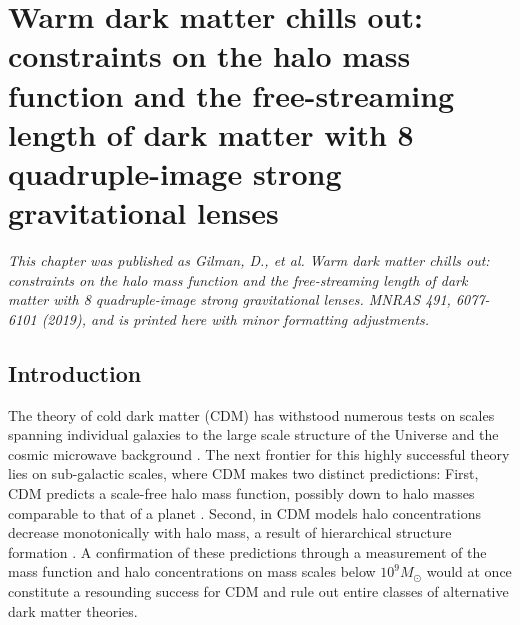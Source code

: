 \def\rein{{$R_{\rm{Ein}}$}}
\def\cmg{{\rm{$\rm{cm}^2 \rm{g}^{-1}$}}}
\def\msun{{M_{\odot}}}
\def\sigmasidm{{$\sigma_{\rm{SIDM}}$}}
\def\dlos{{\delta_{\rm{los}}}}
\def\mhm{{m_{\rm{hm}}}}

\def\data{{\bf{d}_{\rm{n}}}}
\def\datasim{{\bf{d}_{\rm{n}}^{\prime}}}
\def\msub{{\bf{m}_{\rm{sub}}}}
\def\qsub{{\bf{q}_{\rm{s}}}}
\def\fsub{{{f}_{\rm{sub}}}}
\def\fsubmean{{\bar{f}_{\rm{sub}}}}
\def\qmac{{\bf{M}}}
\def\qm{{}{\bf{M}}}
\def\sigmasubmean{0.035 \rm{kpc^{-2}}}
\def\sigmasubonesigma{0.025 < \Sigma_{\rm{sub}} < 0.05 \rm{kpc^{-2}}}
\def\sigmasubtwosigma{0.01 < \Sigma_{\rm{sub}} < 0.075 \rm{kpc^{-2}}}
\def\msubmean{3.9 \times 10^7 \msun \rm{kpc^{-2}}}
\def\msubonesigmalow{2.8 \times 10^7 \msun \rm{kpc^{-2}}}
\def\msubonesigmahigh{5.8 \times 10^7 \msun \rm{kpc^{-2}}}
\def\msubtwosigmalow{1.1 \times 10^7 \msun \rm{kpc^{-2}}}
\def\msubtwosigmalow{8.3 \times 10^7 \msun \rm{kpc^{-2}}}

\def\vspacing{\\[0.15cm]}

\chapter{Warm dark matter chills out: constraints on the halo mass function and the free-streaming length of dark matter with 8 quadruple-image strong gravitational lenses}
\textit{This chapter was published as Gilman, D., et al. Warm dark matter chills out: constraints on the halo mass function and the free-streaming length of dark matter with 8 quadruple-image strong gravitational lenses. MNRAS 491, 6077-6101 (2019), and is printed here with minor formatting adjustments.}
	
\section{Introduction}
The theory of cold dark matter (CDM) has withstood numerous tests on scales spanning individual galaxies to the large scale structure of the Universe and the cosmic microwave background \cite{Tegmark++04,deBlok++08,WMAP9cosmo}. The next frontier for this highly successful theory lies on sub-galactic scales, where CDM makes two distinct predictions: First, CDM predicts a scale-free halo mass function, possibly down to halo masses comparable to that of a planet \cite{Hofmann++01,Angulo++17}. Second, in CDM models halo concentrations decrease monotonically with halo mass, a result of hierarchical structure formation \cite{Moore++99,AvilaReese++01,Zhao++03,DiemerJoyce18}. A confirmation of these predictions through a measurement of the mass function and halo concentrations on mass scales below $10^9 \msun$ would at once constitute a resounding success for CDM and rule out entire classes of alternative dark matter theories. 


